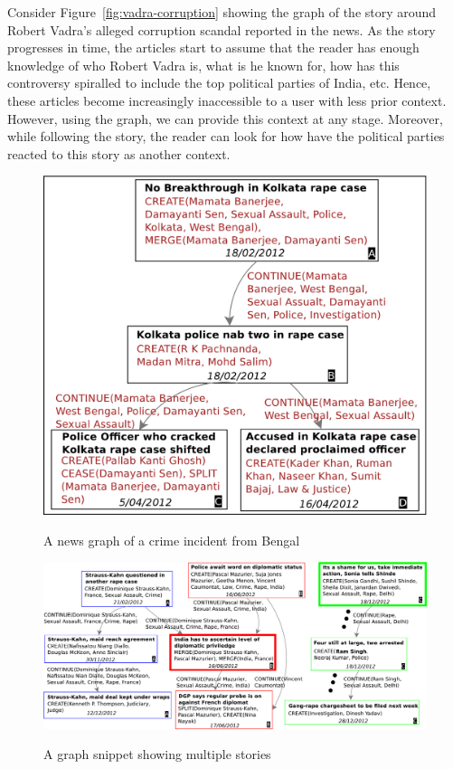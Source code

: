Consider Figure~\ref{fig:vadra-corruption} showing the graph of the story around Robert Vadra's alleged
corruption scandal reported in the news. As the story progresses in time, the articles
start to assume that the reader has enough knowledge of who Robert Vadra is, what is he known for,
how has this controversy spiralled to include the top political parties of India, etc. Hence, these articles
become increasingly inaccessible to a user with less prior context. However, 
using the graph, we can provide this context at any stage. Moreover, while following the story, 
the reader can look for how have the political parties reacted to this story as another context.
\begin{figure}
\caption{A news graph of a crime incident from Bengal}
\includegraphics[scale=0.36]{figures/graph-1.pdf}
\label{fig:sample-news-graph}
\end{figure}

\begin{figure}
\caption{A graph snippet showing multiple stories}
\includegraphics[scale=0.34]{figures/graph-2.pdf}
\label{fig:context-graph-example}
\end{figure}

